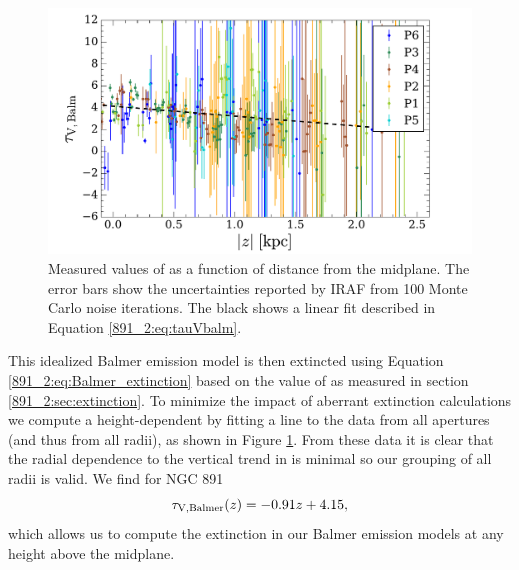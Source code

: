 
\begin{figure}
  \centering
  \includegraphics[width=\columnwidth]{891_2/figs/TauV_balm.pdf}
  \caption[Height dependendence of
    \tauVB]{\fixspacing\label{891_2:fig:tauVB_height}Measured values
    of \tauVB as a function of distance from the midplane. The error
    bars show the uncertainties reported by IRAF from 100 Monte Carlo
    noise iterations. The black shows a linear fit described in
    Equation \ref{891_2:eq:tauVbalm}.}
\end{figure}

This idealized Balmer emission model is then extincted using Equation
\ref{891_2:eq:Balmer_extinction} based on the value of \tauVB as measured in
section \ref{891_2:sec:extinction}. To minimize the impact of aberrant
extinction calculations we compute a height-dependent \tauVB by
fitting a line to the data from all apertures (and thus from all
radii), as shown in Figure \ref{891_2:fig:tauVB_height}. From these data it
is clear that the radial dependence to the vertical trend in \tauVB is
minimal so our grouping of all radii is valid. We find for NGC 891
\begin{equation}
\label{891_2:eq:tauVbalm}
  \tau_{\mathrm{V,Balmer}} (z) = -0.91 z + 4.15,
\end{equation}
which allows us to compute the extinction in our Balmer emission
models at any height above the midplane.

